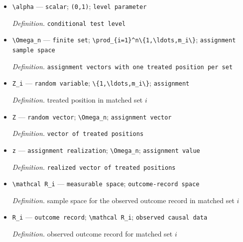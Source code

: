 \documentclass{article}
\begin{document}
\begin{itemize}
  \par\smallskip\noindent\emph{Definition.} Rosenbaum hidden-bias bound for set \(i\)
  \item \texttt{\textbackslash{}\allowbreak{}alpha} --- \texttt{scalar}; \texttt{(0,\allowbreak{}1)}; \texttt{level parameter}
  \par\smallskip\noindent\emph{Definition.} \texttt{conditional test level}
  \item \texttt{\textbackslash{}\allowbreak{}Omega\_\allowbreak{}n} --- \texttt{finite set}; \texttt{\textbackslash{}\allowbreak{}prod\_\allowbreak{}\{i=\allowbreak{}1\}\allowbreak{}\textasciicircum{}n\textbackslash{}\allowbreak{}\{1,\allowbreak{}\textbackslash{}\allowbreak{}ldots,\allowbreak{}m\_\allowbreak{}i\textbackslash{}\allowbreak{}\}\allowbreak{}}; \texttt{assignment sample space}
  \par\smallskip\noindent\emph{Definition.} \texttt{assignment vectors with one treated position per set}
  \item \texttt{Z\_\allowbreak{}i} --- \texttt{random variable}; \texttt{\textbackslash{}\allowbreak{}\{1,\allowbreak{}\textbackslash{}\allowbreak{}ldots,\allowbreak{}m\_\allowbreak{}i\textbackslash{}\allowbreak{}\}\allowbreak{}}; \texttt{assignment}
  \par\smallskip\noindent\emph{Definition.} treated position in matched set \(i\)
  \item \texttt{Z} --- \texttt{random vector}; \texttt{\textbackslash{}\allowbreak{}Omega\_\allowbreak{}n}; \texttt{assignment vector}
  \par\smallskip\noindent\emph{Definition.} \texttt{vector of treated positions}
  \item \texttt{z} --- \texttt{assignment realization}; \texttt{\textbackslash{}\allowbreak{}Omega\_\allowbreak{}n}; \texttt{assignment value}
  \par\smallskip\noindent\emph{Definition.} \texttt{realized vector of treated positions}
  \item \texttt{\textbackslash{}\allowbreak{}mathcal R\_\allowbreak{}i} --- \texttt{measurable space}; \texttt{outcome-\allowbreak{}record space}
  \par\smallskip\noindent\emph{Definition.} sample space for the observed outcome record in matched set \(i\)
  \item \texttt{R\_\allowbreak{}i} --- \texttt{outcome record}; \texttt{\textbackslash{}\allowbreak{}mathcal R\_\allowbreak{}i}; \texttt{observed causal data}
  \par\smallskip\noindent\emph{Definition.} observed outcome record for matched set \(i\)

\end{itemize}
\end{document}
